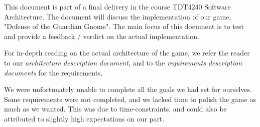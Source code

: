 This document is part of a final delivery in the course TDT4240 Software 
Architecture. The document will discuss the implementation of our game,
"Defense of the Guardian Gnome". The main focus of this document is to test
and provide a feedback / verdict on the actual implementation. 

For in-depth reading on the actual architecture of the game, we refer the
reader to our \emph{architecture description document}, and to the
\emph{requirements description documents} for the requirements. 

We were unfortunately unable to complete all the goals we had set for
ourselves. Some requirements were not completed, and we lacked time to
polish the game as much as we wanted. This was due to time-constraints,
and could also be attributed to slightly high expectations on our part.